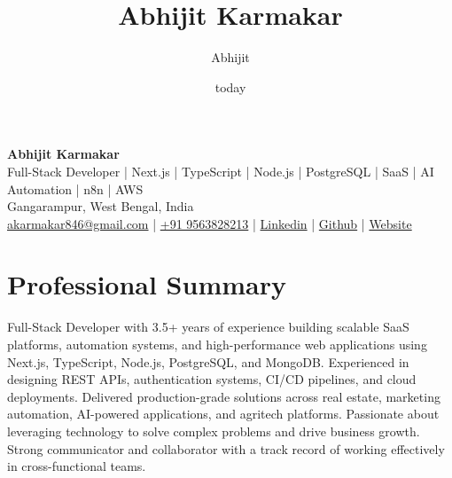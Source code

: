 \documentclass[10pt,a4paper]{article}
\title{Abhijit Karmakar}
\author{Abhijit}
\date{today}
\begin{document}
\thispagestyle{fancy} %

\begin{center}
    {\LARGE \textbf{Abhijit Karmakar}} \\[4pt]
    Full-Stack Developer | Next.js | TypeScript | Node.js | PostgreSQL | SaaS | AI Automation | n8n | AWS \\[6pt]
    Gangarampur, West Bengal, India \\[4pt]
    \href{mailto:akarmakar846@gmail.com}{\color{blue}akarmakar846@gmail.com} \quad | \quad
    \href{tel:+919563828213}{\color{blue}+91 9563828213} \quad | \quad
    \href{https://www.linkedin.com/in/abhijit-karmakar}{\color{blue}Linkedin} \quad | \quad \href{https://github.com/abhijit47}{\color{blue}Github} \quad | \quad
    \href{https://www.abhijitdev.tech}{\color{blue}Website}
\end{center}

\section*{Professional Summary}
\vspace{-10pt}
Full-Stack Developer with 3.5+ years of experience building scalable SaaS platforms, automation systems, and high-performance web applications using Next.js, TypeScript, Node.js, PostgreSQL, and MongoDB. Experienced in designing REST APIs, authentication systems, CI/CD pipelines, and cloud deployments. Delivered production-grade solutions across real estate, marketing automation, AI-powered applications, and agritech platforms. Passionate about leveraging technology to solve complex problems and drive business growth. Strong communicator and collaborator with a track record of working effectively in cross-functional teams.

\end{document}
